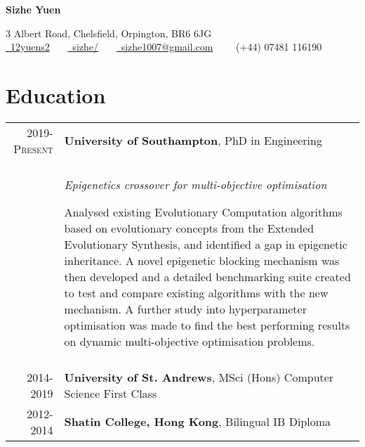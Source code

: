 \documentclass{article}
\begin{document}
\pagestyle{empty} %


\par{\centering
		{\Large \textbf{Sizhe Yuen}
	}\par}

\begin{center}
3 Albert Road, Chelsfield, Orpington, BR6 6JG \\
\href{https://github.com/12yuens2}{\faGithub\ 12yuens2}
\ \ \ \href{https://www.linkedin.com/in/sizhe/}{\faLinkedin\ sizhe/}
\ \ \ \href{mailto:sizhe1007@gmail.com}{\faEnvelopeO\ sizhe1007@gmail.com}
\ \ \ \faMobile\ (+44) 07481 116190
\end{center}


\section*{Education}
\begin{tabular}{r|p{13.5cm}}
\textsc{2019-Present} & \textbf{University of Southampton}, PhD in Engineering
\\
& \\
& \textit{Epigenetics crossover for multi-objective optimisation}

    Analysed existing Evolutionary Computation algorithms
    based on evolutionary concepts from the Extended Evolutionary Synthesis, and 
    identified a gap in epigenetic inheritance.
    A novel epigenetic blocking mechanism was then developed and a detailed benchmarking 
    suite created to test and compare existing algorithms with the new
    mechanism. A further study into hyperparameter optimisation was made to
    find the best performing results on dynamic multi-objective optimisation
    problems.
\\
& \\
\textsc{2014-2019} & \textbf{University of St. Andrews}, MSci (Hons) Computer Science First Class
\\
\textsc{2012-2014} & \textbf{Shatin College, Hong Kong}, Bilingual IB Diploma
\end{tabular}
\end{document}
